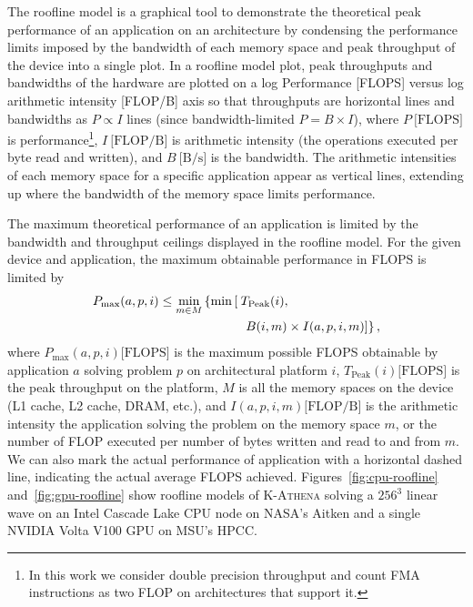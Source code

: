 \documentclass[10pt,journal,compsoc]{IEEEtran}
\newcommand{\textcode}[1]{\textsc{#1}}
\newcommand{\kathena}{\textcode{K-Athena}\xspace}
\begin{document}
The roofline model is a graphical tool to demonstrate the theoretical peak performance of
an application on an architecture by condensing the performance limits imposed
by the bandwidth of each memory space and peak throughput of the device into a
single plot.  In a roofline model plot, peak throughputs and bandwidths
of the hardware are plotted on a log Performance [FLOPS] versus log arithmetic
intensity [FLOP/B] axis so that throughputs are horizontal lines and
bandwidths as $P\propto I$ lines (since bandwidth-limited $P = B \times I$),
where $P~\text{[FLOPS]}$ is performance\footnote{In this work we consider double precision
throughput and count FMA instructions as two FLOP on architectures that support
it.}, $I ~\text{[FLOP/B]}$ is arithmetic intensity (the operations executed per
byte read and written), and $B ~\text{[B/s]}$ is the bandwidth.
The arithmetic intensities of each memory space for a specific
application appear as vertical lines, extending up where the bandwidth of the memory space limits
performance.

The maximum theoretical performance of an application is limited by the
bandwidth and throughput ceilings displayed in the roofline model. For the
given device and application, the maximum obtainable performance in FLOPS is
limited by
\begin{align}
  P_{\text{max}}(a,p,i) \leq 
    \min_{m \in M} \left \{ 
    \min \left [ \right . \right . &
       T_{\text{Peak}}(i),   \\ \notag
        & \left . \left .
       B(i,m) \times I(a,p,i,m) 
       \right ] \right \},
\end{align}
where $P_{\text{max}}(a,p,i) \text{[FLOPS]}$ is the maximum possible FLOPS
obtainable by application $a$ solving problem $p$ on architectural platform
$i$, $T_{\text{Peak}}(i) \text{[FLOPS]}$ is the peak throughput on the
platform,  $M$ is all the memory spaces on the device (L1 cache, L2 cache,
DRAM, etc.), and $I(a,p,i,m) \text{[FLOP/B]}$ is the arithmetic intensity the
application solving the problem on the memory space $m$, or the number of FLOP
executed per number of bytes written and read to and from $m$.  We can also
mark the actual performance of application with a horizontal dashed line,
indicating the actual average FLOPS achieved.  Figures~\ref{fig:cpu-roofline}
and~\ref{fig:gpu-roofline} show roofline models of \kathena solving a $256^3$
linear wave on an Intel Cascade Lake CPU node on NASA's Aitken and a single
NVIDIA Volta V100 GPU on MSU's HPCC.
\end{document}

